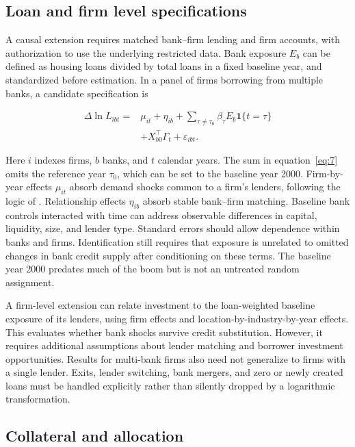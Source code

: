 \documentclass[11pt,letterpaper]{article}
\begin{document}
\subsection{Loan and firm level specifications}

A causal extension requires matched bank--firm lending and firm accounts, with authorization to use the underlying restricted data. Bank exposure $E_b$ can be defined as housing loans divided by total loans in a fixed baseline year, and standardized before estimation. In a panel of firms borrowing from multiple banks, a candidate specification is


\begin{equation}\label{eq:7}
\begin{aligned}\Delta\ln L_{ibt}={}&\mu_{it}+\eta_{ib}+\sum_{\tau\neq\tau_0}\beta_\tau E_b\mathbf{1}\{t=\tau\}\\&+X_{b0}^{\top}\Gamma_t+\varepsilon_{ibt}.\end{aligned}
\end{equation}

Here $i$ indexes firms, $b$ banks, and $t$ calendar years. The sum in equation~\eqref{eq:7} omits the reference year $\tau_0$, which can be set to the baseline year 2000. Firm-by-year effects $\mu_{it}$ absorb demand shocks common to a firm's lenders, following the logic of \citet{khwaja2008}. Relationship effects $\eta_{ib}$ absorb stable bank--firm matching. Baseline bank controls interacted with time can address observable differences in capital, liquidity, size, and lender type. Standard errors should allow dependence within banks and firms. Identification still requires that exposure is unrelated to omitted changes in bank credit supply after conditioning on these terms. The baseline year 2000 predates much of the boom but is not an untreated random assignment.


A firm-level extension can relate investment to the loan-weighted baseline exposure of its lenders, using firm effects and location-by-industry-by-year effects. This evaluates whether bank shocks survive credit substitution. However, it requires additional assumptions about lender matching and borrower investment opportunities. Results for multi-bank firms also need not generalize to firms with a single lender. Exits, lender switching, bank mergers, and zero or newly created loans must be handled explicitly rather than silently dropped by a logarithmic transformation.


\subsection{Collateral and allocation}
\end{document}
